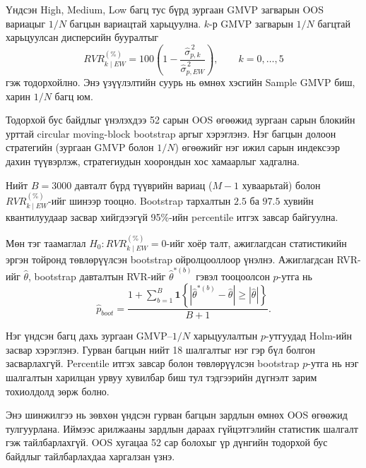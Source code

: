 Үндсэн High, Medium, Low багц тус бүрд
зургаан GMVP загварын OOS вариацыг
$1/N$ багцын вариацтай харьцуулна.
$k$-р GMVP загварын $1/N$ багцтай
харьцуулсан дисперсийн бууралтыг
\[
RVR_{k\mid EW}^{(\%)}
=100\left(
1-\frac{\widehat{\sigma}_{p,k}^{\,2}}
{\widehat{\sigma}_{p,EW}^{\,2}}
\right),\qquad k=0,\ldots,5
\]
гэж тодорхойлно. Энэ үзүүлэлтийн
суурь нь өмнөх хэсгийн Sample GMVP
биш, харин $1/N$ багц юм.

Тодорхой бус байдлыг үнэлэхдээ
52 сарын OOS өгөөжид зургаан сарын
блокийн урттай circular moving-block
bootstrap аргыг хэрэглэнэ. Нэг багцын
долоон стратегийн (зургаан GMVP болон
$1/N$) өгөөжийг нэг ижил сарын
индексээр дахин түүвэрлэж, стратегиудын
хоорондын хос хамаарлыг хадгална.

Нийт $B=3000$ давталт бүрд түүврийн
вариац ($M-1$ хуваарьтай) болон
$RVR_{k\mid EW}^{(\%)}$-ийг шинээр
тооцно. Bootstrap тархалтын $2.5$ ба
$97.5$ хувийн квантилуудаар засвар
хийгдээгүй 95\%-ийн percentile итгэх
завсар байгуулна.

Мөн тэг таамаглал
$H_0:RVR_{k\mid EW}^{(\%)}=0$-ийг
хоёр талт, ажиглагдсан статистикийн
эргэн тойронд төвлөрүүлсэн bootstrap
ойролцооллоор үнэлнэ. Ажиглагдсан
RVR-ийг $\widehat{\theta}$, bootstrap
давталтын RVR-ийг $\widehat{\theta}^{*(b)}$
гэвэл тооцоолсон $p$-утга нь
\[
\widehat{p}_{boot}
=\frac{1+\sum_{b=1}^{B}
	\boldsymbol{1}\!\left\{
	\left|\widehat{\theta}^{*(b)}-\widehat{\theta}\right|
	\geq\left|\widehat{\theta}\right|
	\right\}}{B+1}.
\]

Нэг үндсэн багц дахь зургаан GMVP--$1/N$
харьцуулалтын $p$-утгуудад Holm-ийн
засвар хэрэглэнэ. Гурван багцын
нийт 18 шалгалтыг нэг гэр бүл болгон
засварлахгүй. Percentile итгэх завсар
болон төвлөрүүлсэн bootstrap $p$-утга
нь нэг шалгалтын харилцан урвуу
хувилбар биш тул тэдгээрийн дүгнэлт
зарим тохиолдолд зөрж болно.

Энэ шинжилгээ нь зөвхөн үндсэн гурван
багцын зардлын өмнөх OOS өгөөжид
тулгуурлана. Иймээс арилжааны зардлын
дараах гүйцэтгэлийн статистик шалгалт
гэж тайлбарлахгүй. OOS хугацаа 52 сар
болохыг үр дүнгийн тодорхой бус байдлыг
тайлбарлахдаа харгалзан үзнэ.
